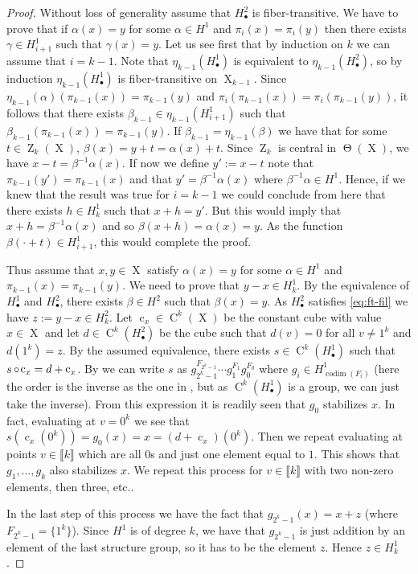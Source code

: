 \documentclass[a4paper,12pt,reqno]{amsart}
\theoremstyle{definition}
\newcommand*{\db}[1]{\llbracket #1\rrbracket}
\DeclareMathOperator{\ab}{Z}
\DeclareMathOperator{\tran}{\Theta}
\DeclareMathOperator{\codim}{codim}
\DeclareMathOperator{\q}{c}
\DeclareMathOperator{\ns}{X}
\DeclareMathOperator{\co}{\circ\hspace{-0.02 cm}}
\DeclareMathOperator{\cu}{C}
\begin{document}
\begin{proof}
Without loss of generality assume that $H^2_\bullet$ is fiber-transitive. We have to prove that if $\alpha(x)=y$ for some $\alpha\in H^1$ and $\pi_i(x)=\pi_i(y)$ then there exists $\gamma\in H^1_{i+1}$ such that $\gamma(x)=y$. Let us see first that by induction on $k$ we can assume that $i=k-1$. Note that $\eta_{k-1}(H_\bullet^1)$ is equivalent to $\eta_{k-1}(H_\bullet^2)$, so by induction $\eta_{k-1}(H_\bullet^1)$ is  fiber-transitive on $\ns_{k-1}$. Since $\eta_{k-1}(\alpha)(\pi_{k-1}(x)) = \pi_{k-1}(y)$ and $\pi_i(\pi_{k-1}(x))=\pi_i(\pi_{k-1}(y))$, it follows that there exists $\beta_{k-1}\in \eta_{k-1}(H^1_{i+1})$ such that $\beta_{k-1}(\pi_{k-1}(x)) = \pi_{k-1}(y)$. If $\beta_{k-1}=\eta_{k-1}(\beta)$ we have that for some $t\in \ab_k(\ns)$, $\beta(x)=y+t=\alpha(x)+t$. Since $\ab_k$ is central in $\tran(\ns)$, we have $x-t=\beta^{-1}\alpha(x)$. If now we define $y':=x-t$ note that $\pi_{k-1}(y')=\pi_{k-1}(x)$ and that $y'=\beta^{-1}\alpha(x)$ where $\beta^{-1}\alpha\in H^1$. Hence, if we knew that the result was true for $i=k-1$ we could conclude from here that there exists $h\in H^1_k$ such that $x+h=y'$. But this would imply that $x+h = \beta^{-1}\alpha(x)$ and so $\beta(x+h)=\alpha(x)=y$. As the function $\beta(\cdot+t)\in H^1_{i+1}$, this would complete the proof.

Thus assume that $x,y\in\ns$ satisfy $\alpha(x)=y$ for some $\alpha\in H^1$ and $\pi_{k-1}(x)=\pi_{k-1}(y)$. We need to prove that $y-x\in H^1_k$. By the equivalence of $H^1_\bullet$ and $H^2_\bullet$, there exists $\beta\in H^2$ such that $\beta(x)=y$. As $H^2_\bullet$ satisfies \eqref{eq:ft-fil} we have $z:=y-x\in H^2_k$. Let $\q_x\in\cu^k(\ns)$ be the constant cube with value $x\in \ns$ and let $d\in\cu^k(H^2_\bullet)$ be the cube such that $d(v)=0$ for all $v\not=1^k$ and $d(1^k)=z$. By the assumed equivalence, there exists $s\in\cu^k(H^1_\bullet)$ such that $s\co \q_x = d+\q_x$. By \cite[Lemma 2.2.5]{Cand:Notes1} we can write $s$ as $g_{2^k-1}^{F_{2^k-1}}\cdots g_1^{F_1}g_0^{F_0}$ where $g_i\in H^1_{\codim(F_i)}$ (here the order is the inverse as the one in \cite[Lemma 2.2.5]{Cand:Notes1}, but as $\cu^k(H^1_\bullet)$ is a group, we can just take the inverse). From this expression it is  readily seen that $g_0$ stabilizes $x$. In fact, evaluating at $v=0^k$ we see that $s(\q_x(0^k))=g_0(x)=x=(d+\q_x)(0^k)$. Then we repeat evaluating at points $v\in \db{k}$ which are all $0$s and just one element equal to $1$. This shows that $g_1,\ldots,g_k$ also stabilizes $x$. We repeat this process for $v\in \db{k}$ with two non-zero elements, then three, etc..

In the last step of this process we have the fact that $g_{2^k-1}(x)=x+z$ (where $F_{2^k-1}=\{1^k\}$). Since $H^1$ is of degree $k$, we have that $g_{2^k-1}$ is just addition by an element of the last structure group, so it has to be the element $z$. Hence $z\in H^1_k$.
\end{proof}
\end{document}
